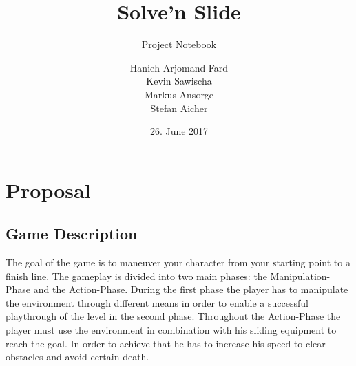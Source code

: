 \documentclass[12pt, letterpaper]{scrartcl}
\title{Solve'n Slide}
\subtitle{Project Notebook}
\author{Hanieh Arjomand-Fard\\Kevin Sawischa\\Markus Ansorge\\Stefan Aicher}
\date{26. June 2017}
\begin{document}
	
	\begin{titlepage}
		\maketitle
	\end{titlepage}
	
	\tableofcontents
	\newpage
	
	\section{Proposal}
	\subsection{Game Description}
	The goal of the game is to maneuver your character from your starting point to a finish line. The gameplay is divided into two main phases: the Manipulation-Phase and the Action-Phase. During the first phase the player has to manipulate the environment through different means in order to enable a successful playthrough of the level in the second phase. Throughout the Action-Phase the player must use the environment in combination with his sliding equipment to reach the goal. In order to achieve that he has to increase his speed to clear obstacles and avoid certain death.
	
\end{document}
